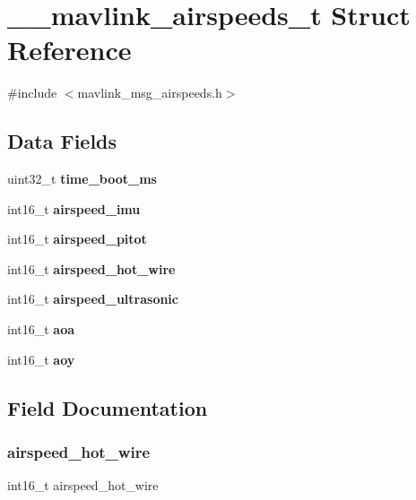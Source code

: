 \section{\+\_\+\+\_\+mavlink\+\_\+airspeeds\+\_\+t Struct Reference}
\label{struct____mavlink__airspeeds__t}


{\ttfamily \#include $<$mavlink\+\_\+msg\+\_\+airspeeds.\+h$>$}

\subsection*{Data Fields}
\begin{DoxyCompactItemize}
\item 
uint32\+\_\+t \textbf{ time\+\_\+boot\+\_\+ms}
\item 
int16\+\_\+t \textbf{ airspeed\+\_\+imu}
\item 
int16\+\_\+t \textbf{ airspeed\+\_\+pitot}
\item 
int16\+\_\+t \textbf{ airspeed\+\_\+hot\+\_\+wire}
\item 
int16\+\_\+t \textbf{ airspeed\+\_\+ultrasonic}
\item 
int16\+\_\+t \textbf{ aoa}
\item 
int16\+\_\+t \textbf{ aoy}
\end{DoxyCompactItemize}


\subsection{Field Documentation}
\mbox{\label{struct____mavlink__airspeeds__t_ab611418e8f8c5cc5d55dfea3bf479f4c}} 
\subsubsection{airspeed\+\_\+hot\+\_\+wire}
{\footnotesize\ttfamily int16\+\_\+t airspeed\+\_\+hot\+\_\+wire}

\mbox{\label{struct____mavlink__airspeeds__t_a1e3799b4024208560debff8c128e5aaf}} 
